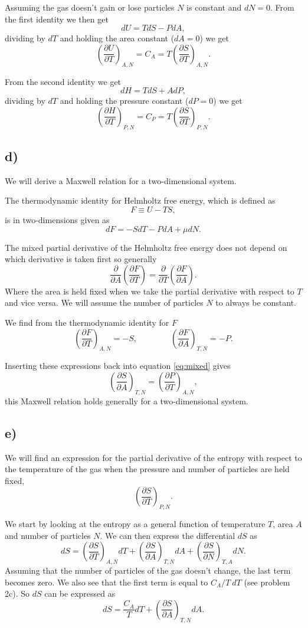\documentclass[a4paper, 11pt, titlepage, english]{article}
\newcommand{\beq}{\begin{equation}}
\newcommand{\eeq}{\end{equation}}
\begin{document}
Assuming the gas doesn't gain or lose particles $N$ is constant and $dN = 0$. From the first identity we then get
$$dU = T dS - P dA,$$
dividing by $dT$ and holding the area constant ($dA = 0$) we get
$$\left(\frac{\partial U}{\partial T}\right)_{A,N} = C_A = T \left(\frac{\partial S}{\partial T}\right)_{A,N}. $$

From the second identity we get
$$dH = T dS + A dP,$$
dividing by $dT$ and holding the pressure constant ($dP = 0$) we get
$$\left(\frac{\partial H}{\partial T}\right)_{P,N} = C_P = T \left(\frac{\partial S}{\partial T}\right)_{P,N}.$$

\subsection*{d)}
We will derive a Maxwell relation for a two-dimensional system.

The thermodynamic identity for Helmholtz free energy, which is defined as
$$F \equiv U - TS,$$
is in two-dimensions given as
$$dF = -S dT - PdA + \mu dN.$$

The mixed partial derivative of the Helmholtz free energy does not depend on which derivative is taken first so generally
\beq
\frac{\partial}{\partial A} \left( \frac{\partial F}{\partial T} \right) = \frac{\partial }{\partial T}\left(\frac{\partial F}{\partial A} \right). \label{eq:mixed}
\eeq
Where the area is held fixed when we take the partial derivative with respect to $T$ and vice versa. We will assume the number of particles $N$ to always be constant. 

We find from the thermodynamic identity for $F$
$$\left(\frac{\partial F}{\partial T}\right)_{A, N} = -S, \qquad \qquad \left(\frac{\partial F}{\partial A}\right)_{T, N} = -P.$$

Inserting these expressions back into equation \ref{eq:mixed} gives
$$\left(\frac{\partial S}{\partial A}\right)_{T,N} = \left(\frac{\partial P}{\partial T}\right)_{A, N},$$
this Maxwell relation holds generally for a two-dimensional system.

\subsection*{e)}
We will find an expression for the partial derivative of the entropy with respect to the temperature of the gas when the pressure and number of particles are held fixed,
$$\left( \frac{\partial S}{\partial T}\right)_{P,N}.$$

We start by looking at the entropy as a general function of temperature $T$, area $A$ and number of particles $N$. We can then express the differential $dS$ as
$$dS = \left(\frac{\partial S}{\partial T}\right)_{A, N} dT + \left(\frac{\partial S}{\partial A}\right)_{T, N} dA + \left(\frac{\partial S}{\partial N}\right)_{T, A} dN.$$
Assuming that the number of particles of the gas doesn't change, the last term becomes zero. We also see that the first term is equal to $C_A/T\ dT$ (see problem 2c). So $dS$ can be expressed as
\beq
dS = \frac{C_A}{T} dT +  \left(\frac{\partial S}{\partial A}\right)_{T, N} dA. \label{eq:dS}
\eeq
\end{document}
